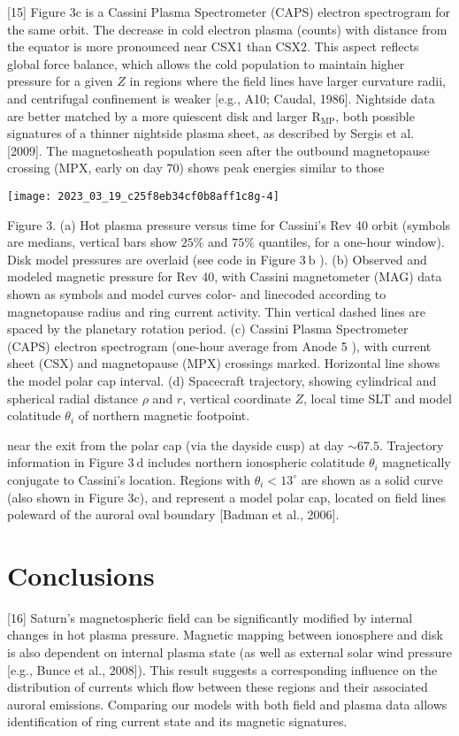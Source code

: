 \documentclass[10pt]{article}
\begin{document}
[15] Figure 3c is a Cassini Plasma Spectrometer (CAPS) electron spectrogram for the same orbit. The decrease in cold electron plasma (counts) with distance from the equator is more pronounced near CSX1 than $\mathrm{CSX} 2$. This aspect reflects global force balance, which allows the cold population to maintain higher pressure for a given $Z$ in regions where the field lines have larger curvature radii, and centrifugal confinement is weaker [e.g., A10; Caudal, 1986]. Nightside data are better matched by a more quiescent disk and larger $\mathrm{R}_{\mathrm{MP}}$, both possible signatures of a thinner nightside plasma sheet, as described by Sergis et al. [2009]. The magnetosheath population seen after the outbound magnetopause crossing (MPX, early on day 70) shows peak energies similar to those

\begin{center}
\texttt{[image: 2023\_03\_19\_c25f8eb34cf0b8aff1c8g-4]}
\end{center}

Figure 3. (a) Hot plasma pressure versus time for Cassini's Rev 40 orbit (symbols are medians, vertical bars show $25 \%$ and $75 \%$ quantiles, for a one-hour window). Disk model pressures are overlaid (see code in Figure $3 \mathrm{~b}$ ). (b) Observed and modeled magnetic pressure for Rev 40, with Cassini magnetometer (MAG) data shown as symbols and model curves color- and linecoded according to magnetopause radius and ring current activity. Thin vertical dashed lines are spaced by the planetary rotation period. (c) Cassini Plasma Spectrometer (CAPS) electron spectrogram (one-hour average from Anode 5 ), with current sheet (CSX) and magnetopause (MPX) crossings marked. Horizontal line shows the model polar cap interval. (d) Spacecraft trajectory, showing cylindrical and spherical radial distance $\rho$ and $r$, vertical coordinate $Z$, local time SLT and model colatitude $\theta_{i}$ of northern magnetic footpoint.

near the exit from the polar cap (via the dayside cusp) at day $\sim 67.5$. Trajectory information in Figure $3 \mathrm{~d}$ includes northern ionospheric colatitude $\theta_{i}$ magnetically conjugate to Cassini's location. Regions with $\theta_{i}<13^{\circ}$ are shown as a solid curve (also shown in Figure 3c), and represent a model polar cap, located on field lines poleward of the auroral oval boundary [Badman et al., 2006].

\section{Conclusions}
[16] Saturn's magnetospheric field can be significantly modified by internal changes in hot plasma pressure. Magnetic mapping between ionosphere and disk is also dependent on internal plasma state (as well as external solar wind pressure [e.g., Bunce et al., 2008]). This result suggests a corresponding influence on the distribution of currents which flow between these regions and their associated auroral emissions. Comparing our models with both field and plasma data allows identification of ring current state and its magnetic signatures.
\end{document}
